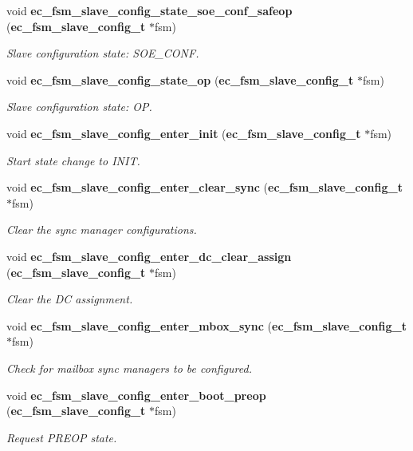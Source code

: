 \begin{DoxyCompactItemize}
void {\bf ec\-\_\-fsm\-\_\-slave\-\_\-config\-\_\-state\-\_\-soe\-\_\-conf\-\_\-safeop} ({\bf ec\-\_\-fsm\-\_\-slave\-\_\-config\-\_\-t} $\ast$fsm)
\begin{DoxyCompactList}\small\item\em \-Slave configuration state\-: \-S\-O\-E\-\_\-\-C\-O\-N\-F. \end{DoxyCompactList}\item 
void {\bf ec\-\_\-fsm\-\_\-slave\-\_\-config\-\_\-state\-\_\-op} ({\bf ec\-\_\-fsm\-\_\-slave\-\_\-config\-\_\-t} $\ast$fsm)
\begin{DoxyCompactList}\small\item\em \-Slave configuration state\-: \-O\-P. \end{DoxyCompactList}\item 
void {\bf ec\-\_\-fsm\-\_\-slave\-\_\-config\-\_\-enter\-\_\-init} ({\bf ec\-\_\-fsm\-\_\-slave\-\_\-config\-\_\-t} $\ast$fsm)
\begin{DoxyCompactList}\small\item\em \-Start state change to \-I\-N\-I\-T. \end{DoxyCompactList}\item 
void {\bf ec\-\_\-fsm\-\_\-slave\-\_\-config\-\_\-enter\-\_\-clear\-\_\-sync} ({\bf ec\-\_\-fsm\-\_\-slave\-\_\-config\-\_\-t} $\ast$fsm)
\begin{DoxyCompactList}\small\item\em \-Clear the sync manager configurations. \end{DoxyCompactList}\item 
void {\bf ec\-\_\-fsm\-\_\-slave\-\_\-config\-\_\-enter\-\_\-dc\-\_\-clear\-\_\-assign} ({\bf ec\-\_\-fsm\-\_\-slave\-\_\-config\-\_\-t} $\ast$fsm)
\begin{DoxyCompactList}\small\item\em \-Clear the \-D\-C assignment. \end{DoxyCompactList}\item 
void {\bf ec\-\_\-fsm\-\_\-slave\-\_\-config\-\_\-enter\-\_\-mbox\-\_\-sync} ({\bf ec\-\_\-fsm\-\_\-slave\-\_\-config\-\_\-t} $\ast$fsm)
\begin{DoxyCompactList}\small\item\em \-Check for mailbox sync managers to be configured. \end{DoxyCompactList}\item 
void {\bf ec\-\_\-fsm\-\_\-slave\-\_\-config\-\_\-enter\-\_\-boot\-\_\-preop} ({\bf ec\-\_\-fsm\-\_\-slave\-\_\-config\-\_\-t} $\ast$fsm)
\begin{DoxyCompactList}\small\item\em \-Request \-P\-R\-E\-O\-P state. \end{DoxyCompactList}\item 

\end{DoxyCompactItemize}
